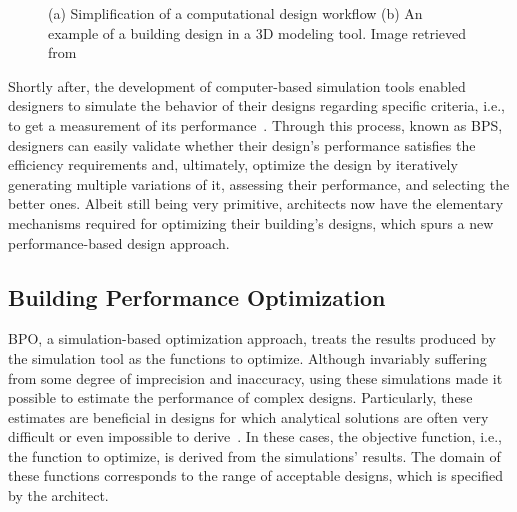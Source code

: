 \begin{figure}[htbp]
\centering
{}%
\hfill
{}%

\caption[General views of Traditional Design Approaches]{(a) Simplification of a computational design workflow (b) An example of a building design in a 3D modeling tool. Image retrieved from~\cite{3DMODELTOOL}}
\label{fig:traditionaldesign}
\end{figure}

Shortly after, the development of computer-based simulation tools enabled designers to simulate the behavior of their designs regarding specific criteria, i.e., to get a measurement of its performance~\cite{Malkawi2005}. Through this process, known as \ac{BPS}, designers can easily validate whether their design's performance satisfies the efficiency requirements and, ultimately, optimize the design by iteratively generating multiple variations of it, assessing their performance, and selecting the better ones. Albeit still being very primitive, architects now have the elementary mechanisms required for optimizing their building's designs, which spurs a new performance-based design approach.

\subsection{Building Performance Optimization}

	\ac{BPO}, a simulation-based optimization approach, treats the results produced by the simulation tool as the functions to optimize. Although invariably suffering from some degree of imprecision and inaccuracy, using these simulations made it possible to estimate the performance of complex designs. Particularly, these estimates are beneficial in designs for which analytical solutions are often very difficult or even impossible to derive~\cite{Kolda2003}. In these cases, the objective function, i.e., the function to optimize, is derived from the simulations' results. The domain of these functions corresponds to the range of acceptable designs,  which is specified by the architect.

